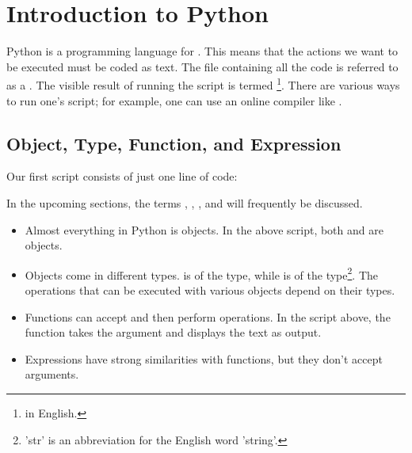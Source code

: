 





\section{Introduction to Python}
Python is a programming language for . This means that the actions we want to be executed must be coded as text. The file containing all the code is referred to as a . The visible result of running the script is termed \footnote{ in English.}. There are various ways to run one's script; for example, one can use an online compiler like .
\subsection{Object, Type, Function, and Expression}
Our first script consists of just one line of code:


In the upcoming sections, the terms , , , and  will frequently be discussed.
\begin{itemize}
	\item Almost everything in Python is objects. In the above script, both  and  are objects.
	\item Objects come in different types.  is of the  type, while  is of the  type\footnote{'str' is an abbreviation for the English word 'string'.}. The operations that can be executed with various objects depend on their types.
	\item Functions can accept  and then perform operations. In the script above, the  function takes the argument  and displays the text as output.
	\item Expressions have strong similarities with functions, but they don't accept arguments.
\end{itemize}

\newpage
